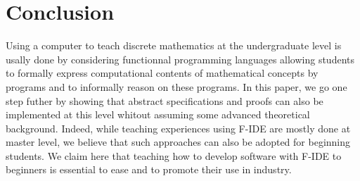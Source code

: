 \documentclass[submission,copyright,creativecommons]{eptcs}
\begin{document}
\section{Conclusion}


Using a computer to teach discrete mathematics at the undergraduate
level is usally done by considering functionnal programming languages
allowing students to formally express computational contents of
mathematical concepts by programs and to informally reason on these
programs. In this paper, we go one step futher by showing that
abstract specifications and proofs can also be implemented at this
level whitout assuming some advanced theoretical background.
Indeed, while teaching experiences using F-IDE are mostly done at master
level, we believe that such approaches can also be adopted for
beginning students. We claim here that teaching how to develop
software with  F-IDE to
beginners is essential to ease and to promote their use in industry.
\end{document}
